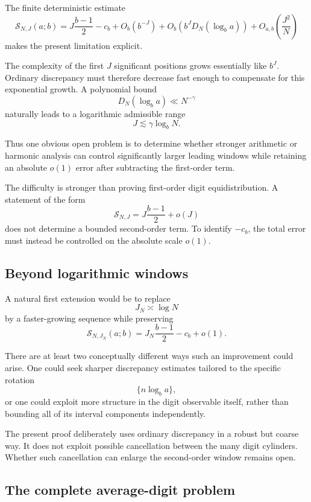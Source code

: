 \documentclass[11pt]{article}
\theoremstyle{definition}
\theoremstyle{remark}
\begin{document}
The finite deterministic estimate
\[
    \mathcal S_{N,J}(a;b)
    =
    J\frac{b-1}{2}
    -
    c_b
    +
    O_b(b^{-J})
    +
    O_b\!\left(b^JD_N(\log_b a)\right)
    +
    O_{a,b}\!\left(\frac{J^2}{N}\right)
\]
makes the present limitation explicit.

The complexity of the first \(J\) significant positions grows
essentially like \(b^J\).  Ordinary discrepancy must therefore decrease
fast enough to compensate for this exponential growth.  A polynomial
bound
\[
    D_N(\log_b a)\ll N^{-\gamma}
\]
naturally leads to a logarithmic admissible range
\[
    J\lesssim\gamma\log_bN.
\]

Thus one obvious open problem is to determine whether stronger
arithmetic or harmonic analysis can control significantly larger
leading windows while retaining an absolute \(o(1)\) error after
subtracting the first-order term.

The difficulty is stronger than proving first-order digit
equidistribution.  A statement of the form
\[
    \mathcal S_{N,J}
    =
    J\frac{b-1}{2}
    +
    o(J)
\]
does not determine a bounded second-order term.  To identify
\(-c_b\), the total error must instead be controlled on the absolute
scale \(o(1)\).


\subsection{Beyond logarithmic windows}
\label{subsec:beyond-logarithmic-windows}

A natural first extension would be to replace
\[
    J_N\asymp\log N
\]
by a faster-growing sequence while preserving
\[
    \mathcal S_{N,J_N}(a;b)
    =
    J_N\frac{b-1}{2}
    -
    c_b
    +
    o(1).
\]

There are at least two conceptually different ways such an improvement
could arise.  One could seek sharper discrepancy estimates tailored to
the specific rotation
\[
    \{n\log_b a\},
\]
or one could exploit more structure in the digit observable itself,
rather than bounding all of its interval components independently.

The present proof deliberately uses ordinary discrepancy in a robust
but coarse way.  It does not exploit possible cancellation between the
many digit cylinders.  Whether such cancellation can enlarge the
second-order window remains open.


\subsection{The complete average-digit problem}
\label{subsec:complete-average-digit}
\end{document}
